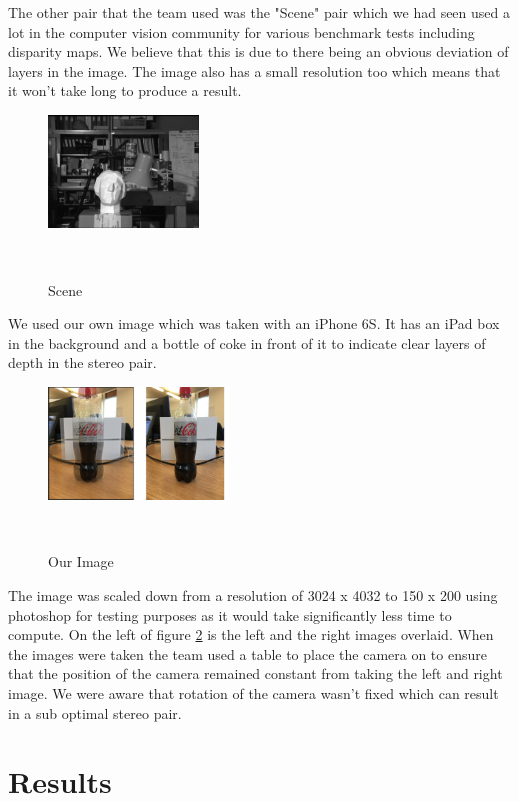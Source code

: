 \documentclass[twocolumn]{article}
\begin{document}
The other pair that the team used was the "Scene" pair which we had seen used a lot in the computer vision community \cite{sceneusage} \cite{sceneusage2} for various benchmark tests including disparity maps. We believe that this is due to there being an obvious deviation of layers in the image. The image also has a small resolution too which means that it won't take long to produce a result.  

\begin{figure}[H]
\centering
  \includegraphics[width=40mm]{Figures/scene}
    \caption{Scene}~\label{fig:scene}
\end{figure} 

We used our own image which was taken with an iPhone 6S. It has an iPad box in the background and a bottle of coke in front of it to indicate clear layers of depth in the stereo pair.

\begin{figure}[H]
\centering
  \includegraphics[height=30mm]{Figures/Coke_Image}
    \caption{Our Image}~\label{fig:CokeScene}
\end{figure} 

The image was scaled down from a resolution of 3024 x 4032 to 150 x 200 using photoshop for testing purposes as it would take significantly less time to compute. On the left of figure \ref{fig:CokeScene} is the left and the right images overlaid. When the images were taken the team used a table to place the camera on to ensure that the position of the camera remained constant from taking the left and right image. We were aware that rotation of the camera wasn't fixed which can result in a sub optimal stereo pair.  



\section{Results}
\vspace{-1ex}
\end{document}
